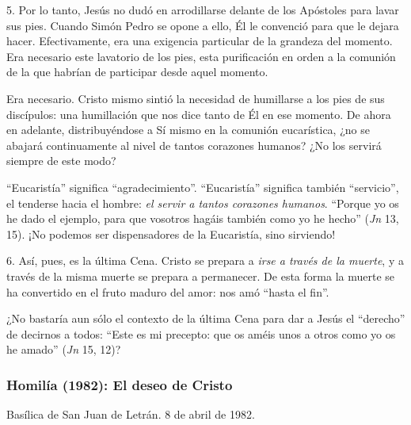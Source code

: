 			\begin{body}5. Por lo tanto, Jesús no dudó en arrodillarse delante de los Apóstoles para lavar sus pies. Cuando Simón Pedro se opone a ello, Él le convenció para que le dejara hacer. Efectivamente, era una exigencia particular de la grandeza del momento. Era necesario este lavatorio de los pies, esta purificación en orden a la comunión de la que habrían de participar desde aquel momento.\end{body}
			
			\begin{body}Era necesario. Cristo mismo sintió la necesidad de humillarse a los pies de sus discípulos: una humillación que nos dice tanto de Él en ese momento. De ahora en adelante, distribuyéndose a Sí mismo en la comunión eucarística, ¿no se abajará continuamente al nivel de tantos corazones humanos? ¿No los servirá siempre de este modo?\end{body}
			
			\begin{body}“Eucaristía” significa “agradecimiento”. “Eucaristía” significa también “servicio”, el tenderse hacia el hombre: \textit{el servir a tantos corazones humanos}. “Porque yo os he dado el ejemplo, para que vosotros hagáis también como yo he hecho” (\textit{Jn }13, 15). ¡No podemos ser dispensadores de la Eucaristía, sino sirviendo!\end{body}
			
			\begin{body}6. Así, pues, es la última Cena. Cristo se prepara a \textit{irse a través de la muerte}, y a través de la misma muerte se prepara a permanecer. De esta forma la muerte se ha convertido en el fruto maduro del amor: nos amó “hasta el fin”.\end{body}
			
			\begin{body}¿No bastaría aun sólo el contexto de la última Cena para dar a Jesús el “derecho” de decirnos a todos: “Este es mi precepto: que os améis unos a otros como yo os he amado” (\textit{Jn} 15, 12)?\end{body}
			
			\subsubsection{Homilía (1982): El deseo de Cristo}
			
			\begin{referencia}Basílica de San Juan de Letrán. 8 de abril de 1982.\end{referencia}
			
